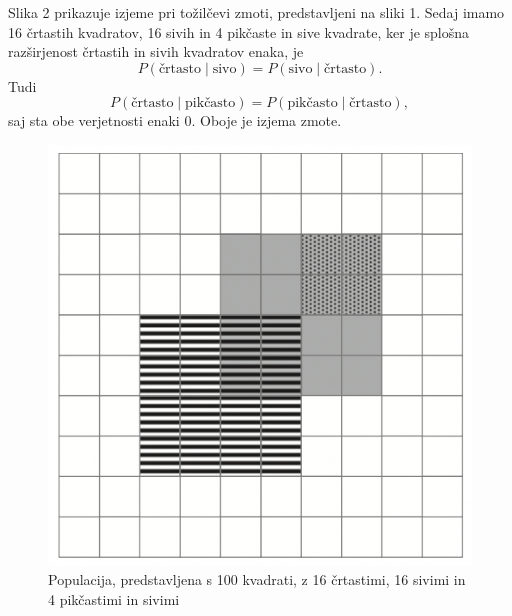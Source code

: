 \documentclass[a4paper,12pt]{article}
\begin{document}
 Slika 2 prikazuje izjeme pri tožilčevi zmoti, predstavljeni na sliki 1. Sedaj imamo 16 črtastih kvadratov, 16 sivih in 4 pikčaste in sive kvadrate, ker je splošna 
 razširjenost črtastih in sivih kvadratov enaka, je
 \[ P(\text{črtasto} \mid \text{sivo}) = P(\text{sivo} \mid \text{črtasto}).\]
Tudi 
\[P(\text{črtasto} \mid \text{pikčasto}) = P(\text{pikčasto} \mid \text{črtasto}),\]
saj sta obe verjetnosti enaki $0$. Oboje je izjema zmote. 

\begin{figure}[!ht]
    \centering
    \label{fig:slika1}
    \includegraphics[scale=0.60]{slika2.png}
    \caption{Populacija, predstavljena s 100 kvadrati, z 16 črtastimi, 16 sivimi in 4 pikčastimi in sivimi}\vspace{2mm}
 \end{figure}
\end{document}
